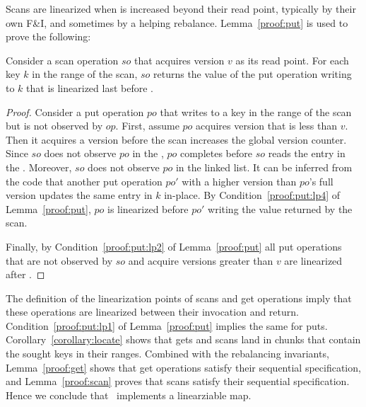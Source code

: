 Scans are linearized when  is increased beyond their read point, typically by their own F\&I, and sometimes by a helping rebalance. 
Lemma~\ref{proof:put} is used to prove the following:
\begin{lemma}
\label{proof:scan}
Consider a scan operation $so$ that acquires version $v$ as its read point. For each key $k$ in the range of the scan, $so$ returns the value of the put operation writing to $k$ that is linearized last before .
\end{lemma}
\begin{proof}

Consider a put operation $po$ that writes to a key in the range of the scan but is not observed by $op$. First, assume 
$po$ acquires version that is less than $v$. Then it acquires a version before the scan increases the global version counter. Since $so$ does not observe $po$ in the , $po$ completes before $so$ reads the entry in the . Moreover, $so$ does not observe $po$ in the linked list. It can be inferred from the code that another put operation $po'$ with a higher version than $po$'s full version updates the same entry in $k$ in-place.
By Condition~\ref{proof:put:lp4} of Lemma~\ref{proof:put}, $po$ is linearized before $po'$ writing the value returned by the scan.

Finally, by Condition~\ref{proof:put:lp2} of Lemma~\ref{proof:put} all put operations that are not observed by $so$ and acquire versions greater than $v$ are linearized after .
\end{proof}

The definition of the linearization points of scans and get operations imply that these operations are linearized between their invocation and return.
Condition~\ref{proof:put:lp1} of Lemma~\ref{proof:put} implies the same for puts. 
Corollary~\ref{corollary:locate} shows that gets and scans land in chunks that contain the sought keys in their ranges. Combined with the rebalancing invariants,
Lemma~\ref{proof:get} shows that get operations satisfy their sequential specification, and Lemma~\ref{proof:scan} proves that scans satisfy their sequential specification. 
Hence we conclude that \kiwi\ implements a linearziable map. 
